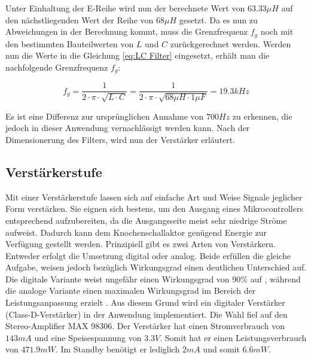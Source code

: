 Unter Einhaltung der {\glqq E-Reihe\grqq} wird nun der berechnete Wert von $63.33\mu H$ auf den nächstliegenden Wert der Reihe von $68\mu H$ gesetzt. Da es nun zu Abweichungen in der Berechnung kommt, muss die Grenzfrequenz $f_g$ noch mit den bestimmten Bauteilwerten von $L$ und $C$ zurückgerechnet werden. Werden nun die Werte in die Gleichung \ref{eq:LC Filter} eingesetzt, erhält man die nachfolgende Grenzfrequenz $f_g$:

\begin{equation}
f_g = \frac{1}{2\cdot \pi \cdot \sqrt{L\cdot C}} = \frac{1}{2\cdot \pi \cdot \sqrt{68\mu H \cdot 1 \mu F}} = 19.3 kHz
\label{eq:LC Filter}
\end{equation}

Es ist eine Differenz zur ursprünglichen Annahme von $700 Hz$ zu erkennen, die jedoch in dieser Anwendung vernachlässigt werden kann. Nach der Dimensionerung des Filters, wird nun der Verstärker erläutert.

\subsection{Verstärkerstufe} \label{sec:verstaerkerstufe}
Mit einer Verstärkerstufe lassen sich auf einfache Art und Weise Signale jeglicher Form verstärken. Sie eignen sich bestens, um den Ausgang eines Mikrocontrollers entsprechend aufzubereiten, da die Ausgangsseite meist sehr niedrige Ströme aufweist. Dadurch kann dem Knochenschallaktor genügend Energie zur Verfügung gestellt werden. Prinzipiell gibt es zwei Arten von Verstärkern. Entweder erfolgt die Umsetzung digital oder analog. Beide erfüllen die gleiche Aufgabe, weisen jedoch bezüglich Wirkungsgrad einen deutlichen Unterschied auf. Die digitale Variante weist ungefähr einen Wirkungsgrad von 90$\%$ auf \cite{BoneConductorAdafruit}, während die analoge Variante einen maximalen Wirkungsgrad im Bereich der Leistungsanpassung erzielt \cite{Niklaus_Skript}. Aus diesem Grund wird ein digitaler Verstärker (Class-D-Verstärker) in der Anwendung implementiert. Die Wahl fiel auf den Stereo-Amplifier MAX 98306. Der Verstärker hat einen Stromverbrauch von $143mA$ und eine Speisespannung von $3.3V$. Somit hat er einen Leistungsverbrauch von $471.9 mW$. Im Standby benötigt er lediglich $2 mA$ und somit $6.6 mW$\cite{Verstaerker}.


